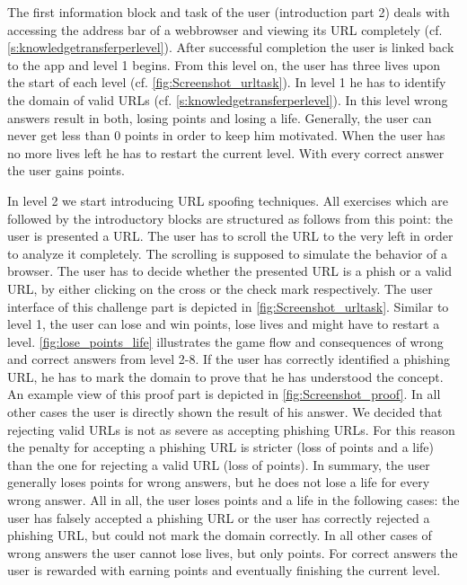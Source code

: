\begin{description}[leftmargin=0cm]
	\item[Obtaining Basic Knowledge:]  
The first information block and task of the user (introduction part 2) deals with accessing the address bar of a webbrowser and viewing its URL completely (cf. \autoref{s:knowledgetransferperlevel}).
 After successful completion the user is linked back to the app and level 1 begins.
 From this level on, the user has three lives upon the start of each level (cf. \autoref{fig:Screenshot_urltask}).
 In level 1 he has to identify the domain of valid URLs (cf. \autoref{s:knowledgetransferperlevel}).
 In this level wrong answers result in both, losing points and losing a life.
 Generally, the user can never get less than 0 points in order to keep him motivated.
 When the user has no more lives left he has to restart the current level.
 With every correct answer the user gains points.
	\item[The Actual Game:]  In level 2 we start introducing URL spoofing techniques. 
All exercises which are followed by the introductory blocks are structured as follows from this point: the user is presented a URL.
The user has to scroll the URL to the very left in order to analyze it completely.
The scrolling is supposed to simulate the behavior of a browser.
The user has to decide whether the presented URL is a phish or a valid URL, by either clicking on the cross or the check mark respectively.
The user interface of this challenge part is depicted in \autoref{fig:Screenshot_urltask}.
 Similar to level 1, the user can lose and win points, lose lives and might have to restart a level.
\autoref{fig:lose_points_life} illustrates the game flow and consequences of wrong and correct answers from level 2-8.
 If the user has correctly identified a phishing URL, he has to mark the domain to prove that he has understood the concept.
An example view of this proof part is depicted in \autoref{fig:Screenshot_proof}.
 In all other cases the user is directly shown the result of his answer.
 We decided that rejecting valid URLs is not as severe as accepting phishing URLs.
 For this reason the penalty for accepting a phishing URL is stricter (loss of points and a life) than the one for rejecting a valid URL (loss of points).
 In summary, the user generally loses points for wrong answers, but he does not lose a life for every wrong answer.
 All in all, the user loses points and a life in the following cases: the user has falsely accepted a phishing URL or the user has correctly rejected a phishing URL, but could not mark the domain correctly. In all other cases of wrong answers the user cannot lose lives, but only points.
For correct answers the user is rewarded with earning points and eventually finishing the current level.
\end{description}



